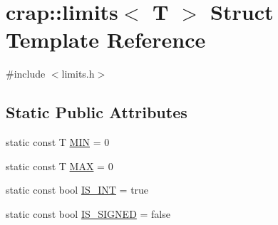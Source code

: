 \hypertarget{structcrap_1_1limits}{\section{crap\-:\-:limits$<$ T $>$ Struct Template Reference}
\label{structcrap_1_1limits}
}


{\ttfamily \#include $<$limits.\-h$>$}

\subsection*{Static Public Attributes}
\begin{DoxyCompactItemize}
\item 
static const T \hyperlink{structcrap_1_1limits_a0a11545145a7f4de4432d3956f1a2159}{M\-I\-N} = 0
\item 
static const T \hyperlink{structcrap_1_1limits_a757efc25bd4c43dd068be5ff95331afe}{M\-A\-X} = 0
\item 
static const bool \hyperlink{structcrap_1_1limits_a2e4a49dbaed009a912dece7de56da35e}{I\-S\-\_\-\-I\-N\-T} = true
\item 
static const bool \hyperlink{structcrap_1_1limits_a1a2b5a6b5063ca03900e9c1955db561b}{I\-S\-\_\-\-S\-I\-G\-N\-E\-D} = false
\end{DoxyCompactItemize}


